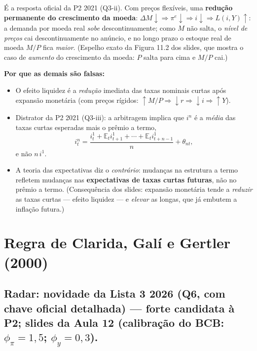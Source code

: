 \documentclass[12pt, a4paper]{article}
\newcommand{\E}{\mathbb{E}}
\begin{document}
\begin{correctbox}[title={Resposta correta: b)}]
É a resposta oficial da P2 2021 (Q3-ii). Com preços flexíveis, uma
\textbf{redução permanente do crescimento da moeda}:
$\Delta M\downarrow \Rightarrow \pi^e\downarrow \Rightarrow i\downarrow
\Rightarrow L(i,Y)\uparrow$: a demanda por moeda real \emph{sobe}
descontinuamente; como $M$ não salta, o \emph{nível de preços} cai
descontinuamente no anúncio, e no longo prazo o estoque real de moeda $M/P$ fica
\emph{maior}. (Espelho exato da Figura 11.2 dos slides, que mostra o caso de
\emph{aumento} do crescimento da moeda: $P$ salta para cima e $M/P$ cai.)
\checkmark

\textbf{Por que as demais são falsas:}
\begin{itemize}[leftmargin=*]
\item[a)] O efeito liquidez é a \emph{redução} imediata das taxas nominais
curtas após expansão monetária (com preços rígidos:
$\uparrow M/P \Rightarrow \downarrow r \Rightarrow \downarrow i
\Rightarrow \uparrow Y$).
\item[c)] Distrator da P2 2021 (Q3-iii): a arbitragem implica que $i^n$ é a
\emph{média} das taxas curtas esperadas mais o prêmio a termo,
\[
i_t^n = \frac{i_t^1 + \E_t i_{t+1}^1 + \cdots + \E_t i_{t+n-1}^1}{n} + \theta_{nt},
\]
e não $n\,i^1$.
\item[d)] A teoria das expectativas diz o \emph{contrário}: mudanças na
estrutura a termo refletem mudanças nas \textbf{expectativas de taxas curtas
futuras}, não no prêmio a termo. (Consequência dos slides: expansão monetária
tende a \emph{reduzir} as taxas curtas --- efeito liquidez --- e \emph{elevar}
as longas, que já embutem a inflação futura.)
\end{itemize}
\end{correctbox}

\section{Regra de Clarida, Galí e Gertler (2000)}

\subsection{Radar: novidade da Lista 3 2026 (Q6, com chave oficial detalhada) --- forte candidata à P2; slides da Aula 12 (calibração do BCB: $\phi_\pi = 1{,}5$; $\phi_y = 0{,}3$).}
\end{document}
